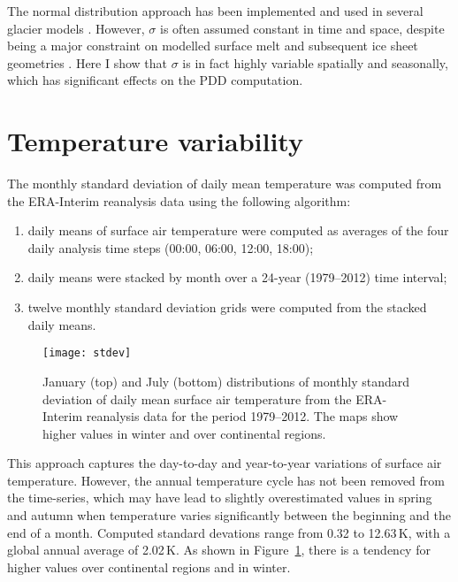 \documentclass[review]{igs}
\begin{document}
The normal distribution approach has been implemented and used in several glacier models \citep[e.g.][]{letreguilly-etal-1991,greve-1997,seddik-etal-2012,charbit-etal-2013}. However, $\sigma$ is often assumed constant in time and space, despite being a major constraint on modelled surface melt and subsequent ice sheet geometries \citep{charbit-etal-2013}. Here I show that $\sigma$ is in fact highly variable spatially and seasonally, which has significant effects on the PDD computation.


\section{Temperature variability}

The monthly standard deviation of daily mean temperature was computed from the ERA-Interim reanalysis \citep{data:erai} data using the following algorithm:

\begin{enumerate}
  \item daily means of surface air temperature were computed as averages of the four daily analysis time steps (00:00, 06:00, 12:00, 18:00);
  \item daily means were stacked by month over a 24-year (1979--2012) time interval;
  \item twelve monthly standard deviation grids were computed from the stacked daily means.
\end{enumerate}

\begin{figure}
  \centering\texttt{[image: stdev]}
  \caption{January (top) and July (bottom) distributions of monthly standard deviation of daily mean surface air temperature from the ERA-Interim reanalysis \citep{data:erai} data for the period 1979--2012. The maps show higher values in winter and over continental regions.}
  \label{fig:stdev}
\end{figure}

This approach captures the day-to-day and year-to-year variations of surface air temperature. However, the annual temperature cycle has not been removed from the time-series, which may have lead to slightly overestimated values in spring and autumn when temperature varies significantly between the beginning and the end of a month. Computed standard devations range from 0.32 to 12.63\,K, with a global annual average of 2.02\,K. As shown in Figure~\ref{fig:stdev}, there is a tendency for higher values over continental regions and in winter.
\end{document}
